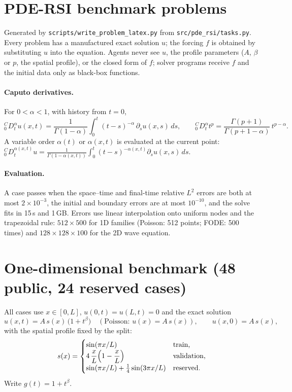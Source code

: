 \documentclass[11pt]{article}
\newcommand{\Caputo}[1]{{}^{C}_{0}D_t^{#1}}
\begin{document}
\section*{PDE-RSI benchmark problems}

Generated by \texttt{scripts/write\_problem\_latex.py} from \texttt{src/pde\_rsi/tasks.py}. Every problem has a
manufactured exact solution $u$; the forcing $f$ is obtained by substituting $u$ into the equation.
Agents never see $u$, the profile parameters ($A$, $\beta$ or $p$, the spatial profile), or the closed form
of $f$; solver programs receive $f$ and the initial data only as black-box functions.

\paragraph{Caputo derivatives.} For $0<\alpha<1$, with history from $t=0$,
\begin{equation*}
\Caputo{\alpha}u(x,t) = \frac{1}{\Gamma(1-\alpha)}\int_0^t (t-s)^{-\alpha}\,\partial_s u(x,s)\,ds,
\qquad \Caputo{\alpha} t^{p} = \frac{\Gamma(p+1)}{\Gamma(p+1-\alpha)}\,t^{p-\alpha}.
\end{equation*}
A variable order $\alpha(t)$ or $\alpha(x,t)$ is evaluated at the current point:
$\Caputo{\alpha(x,t)}u = \frac{1}{\Gamma(1-\alpha(x,t))}\int_0^t (t-s)^{-\alpha(x,t)}\partial_s u(x,s)\,ds$.

\paragraph{Evaluation.} A case passes when the space--time and final-time relative $L^2$ errors are both at most
$2\times10^{-3}$, the initial and boundary errors are at most $10^{-10}$, and the solve fits in 15\,s and 1\,GB.
Errors use linear interpolation onto uniform nodes and the trapezoidal rule:
$512\times500$ for 1D families (Poisson: 512 points; FODE:
500 times) and $128\times128\times100$
for the 2D wave equation.


\section{One-dimensional benchmark (48 public, 24 reserved cases)}
All cases use $x\in[0,L]$, $u(0,t)=u(L,t)=0$ and the exact solution
\begin{equation*}
u(x,t) = A\,s(x)\,\bigl(1+t^{\beta}\bigr) \quad (\text{Poisson: } u(x)=A\,s(x)), \qquad u(x,0)=A\,s(x),
\end{equation*}
with the spatial profile fixed by the split:
\begin{equation*}
s(x)=\begin{cases}
\sin(\pi x/L) & \text{train,}\\
4\,\dfrac{x}{L}\Bigl(1-\dfrac{x}{L}\Bigr) & \text{validation,}\\
\sin(\pi x/L)+\tfrac14\sin(3\pi x/L) & \text{reserved.}
\end{cases}
\end{equation*}
Write $g(t)=1+t^{\beta}$.
\end{document}
